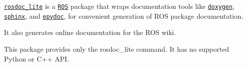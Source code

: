 \href{http://wiki.ros.org/rosdoc_lite}{\tt rosdoc\+\_\+lite} is a \href{http://www.ros.org}{\tt R\+OS} package that wraps documentation tools like \href{http://www.doxygen.org}{\tt doxygen}, \href{http://sphinx-doc.org}{\tt sphinx}, and \href{http://epydoc.sourceforge.net/}{\tt epydoc}, for convenient generation of R\+OS package documentation.

It also generates online documentation for the R\+OS wiki.

This package provides only the {\ttfamily rosdoc\+\_\+lite} command. It has no supported Python or C++ A\+PI. 